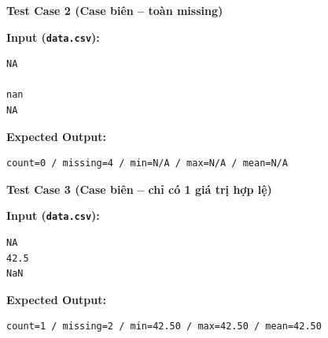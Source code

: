 \vspace{0.5cm}

\textbf{Test Case 2 (Case biên -- toàn missing)}

\textbf{Input (\texttt{data.csv}):}
\begin{lstlisting}
NA

nan
NA
\end{lstlisting}

\textbf{Expected Output:}
\begin{lstlisting}
count=0 / missing=4 / min=N/A / max=N/A / mean=N/A
\end{lstlisting}

\vspace{0.5cm}

\textbf{Test Case 3 (Case biên -- chỉ có 1 giá trị hợp lệ)}

\textbf{Input (\texttt{data.csv}):}
\begin{lstlisting}
NA
42.5
NaN
\end{lstlisting}

\textbf{Expected Output:}
\begin{lstlisting}
count=1 / missing=2 / min=42.50 / max=42.50 / mean=42.50
\end{lstlisting}